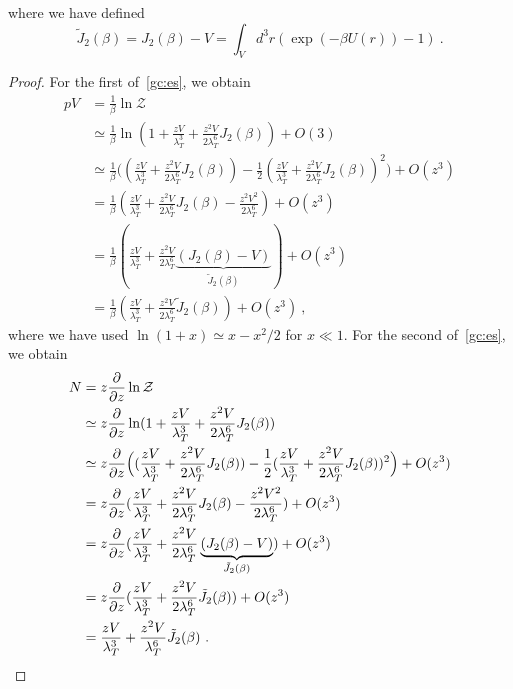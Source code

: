     where we have defined 
    \begin{equation*}
        \tilde J_2 (\beta) = J_2 (\beta) - V = \int_V d^3 r (\exp(- \beta U(r)) - 1) ~.
    \end{equation*}
    \begin{proof}
        For the first of~\eqref{gc:es}, we obtain 
        \begin{equation*}
        \begin{aligned}
            p V & = \frac{1}{\beta} \ln \mathcal Z \\ & \simeq \frac{1}{\beta} \ln (1 + \frac{z V}{\lambda_T^3} + \frac{z^2 V}{2 \lambda_T^6} J_2 (\beta)) + O(3) \\ & \simeq \frac{1}{\beta} \Big ( (\frac{z V}{\lambda_T^3} + \frac{z^2 V}{2 \lambda_T^6} J_2 (\beta)) - \frac{1}{2} (\frac{z V}{\lambda_T^3} + \frac{z^2 V}{2 \lambda_T^6} J_2 (\beta))^2 \Big) + O(z^3) \\ & = \frac{1}{\beta} (\frac{z V}{\lambda_T^3} + \frac{z^2 V}{2 \lambda_T^6} J_2 (\beta) - \frac{z^2 V^2}{2 \lambda_T^6}) + O(z^3) \\ & = \frac{1}{\beta} (\frac{z V}{\lambda_T^3} + \frac{z^2 V}{2 \lambda_T^6} \underbrace{(J_2 (\beta) - V)}_{\tilde J_2 (\beta)}) + O(z^3) \\ & = \frac{1}{\beta} (\frac{zV}{\lambda_T^3} + \frac{z^2V}{2 \lambda_T^6} \tilde J_2 (\beta)) + O(z^3) ~,
        \end{aligned}
        \end{equation*}
        where we have used $\ln (1 + x) \simeq x - x^2/2$ for $x \ll 1$.
        For the second of~\eqref{gc:es}, we obtain 
        \begin{equation*}
        \begin{aligned}
            N & = z \frac{\partial}{\partial z} \ln \mathcal Z \\ & \simeq z \frac{\partial}{\partial z} \ln (1 + \frac{z V}{\lambda_T^3} + \frac{z^2 V}{2 \lambda_T^6} J_2 (\beta)) \\ & \simeq z \frac{\partial}{\partial z} \Big ( (\frac{z V}{\lambda_T^3} + \frac{z^2 V}{2 \lambda_T^6} J_2 (\beta)) - \frac{1}{2} (\frac{z V}{\lambda_T^3} + \frac{z^2 V}{2 \lambda_T^6} J_2 (\beta))^2 \Big) + O(z^3) \\ & = z \frac{\partial}{\partial z} (\frac{z V}{\lambda_T^3} + \frac{z^2 V}{2 \lambda_T^6} J_2 (\beta) - \frac{z^2 V^2}{2 \lambda_T^6}) + O(z^3)
            \\ & = z \frac{\partial}{\partial z} (\frac{z V}{\lambda_T^3} + \frac{z^2 V}{2 \lambda_T^6} \underbrace{(J_2 (\beta) - V)}_{\tilde J_2 (\beta)}) + O(z^3) \\ & = z \frac{\partial}{\partial z} (\frac{zV}{\lambda_T^3} + \frac{z^2V}{2 \lambda_T^6} \tilde J_2 (\beta)) + O(z^3) \\ & = \frac{z V}{\lambda_T^3} + \frac{z^2 V }{\lambda_T^6} \tilde J_2 (\beta) ~.
        \end{aligned}
        \end{equation*}
    \end{proof}
